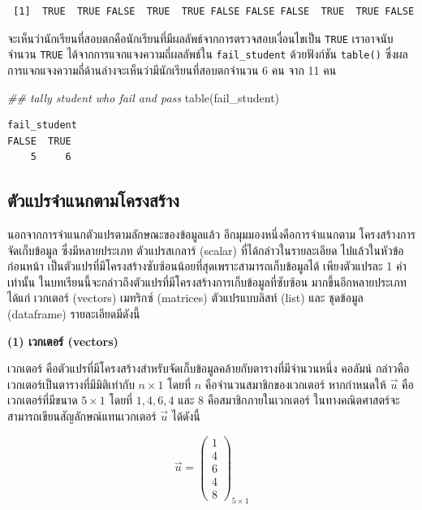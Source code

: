 \documentclass[
  a4paper,
]{book}
\newenvironment{Shaded}{\begin{snugshade}}{\end{snugshade}}
\newcommand{\DocumentationTok}[1]{\textcolor[rgb]{0.37,0.37,0.37}{\textit{#1}}}
\newcommand{\FunctionTok}[1]{\textcolor[rgb]{0.28,0.35,0.67}{#1}}
\newcommand{\NormalTok}[1]{\textcolor[rgb]{0.00,0.23,0.31}{#1}}
\begin{document}
\begin{verbatim}
 [1]  TRUE  TRUE FALSE  TRUE  TRUE FALSE FALSE FALSE  TRUE  TRUE FALSE
\end{verbatim}

จะเห็นว่านักเรียนที่สอบตกคือนักเรียนที่มีผลลัพธ์จากการตรวจสอบเงื่อนไขเป็น \texttt{TRUE}
เราอาจนับจำนวน \texttt{TRUE} ได้จากการแจกแจงความถี่ผลลัพธ์ใน
\texttt{fail\_student} ด้วยฟังก์ชัน \texttt{table()}
ซึ่งผลการแจกแจงความถี่ด้านล่างจะเห็นว่ามีนักเรียนที่สอบตกจำนวน 6 คน จาก 11 คน

\begin{Shaded}
\begin{Highlighting}[]
\DocumentationTok{\#\# tally student who fail and pass}
\FunctionTok{table}\NormalTok{(fail\_student)}
\end{Highlighting}
\end{Shaded}

\begin{verbatim}
fail_student
FALSE  TRUE 
    5     6 
\end{verbatim}

\subsection{ตัวแปรจำแนกตามโครงสร้าง}\label{uxe15uxe27uxe41uxe1buxe23uxe08uxe33uxe41uxe19uxe01uxe15uxe32uxe21uxe42uxe04uxe23uxe07uxe2auxe23uxe32uxe07}

นอกจากการจำแนกตัวแปรตามลักษณะของข้อมูลแล้ว อีกมุมมองหนึ่งคือการจำแนกตาม
โครงสร้างการจัดเก็บข้อมูล ซึ่งมีหลายประเภท ตัวแปรสเกลาร์ (scalar)
ที่ได้กล่าวในรายละเอียด ไปแล้วในหัวข้อก่อนหน้า
เป็นตัวแปรที่มีโครงสร้างซับซ้อนน้อยที่สุดเพราะสามารถเก็บข้อมูลได้ เพียงตัวแปรละ 1 ค่าเท่านั้น
ในบทเรียนนี้จะกล่าวถึงตัวแปรที่มีโครงสร้างการเก็บข้อมูลที่ซับซ้อน มากขึ้นอีกหลายประเภท ได้แก่
เวกเตอร์ (vectors) เมทริกซ์ (matrices) ตัวแปรแบบลิสท์ (list) และ ชุดข้อมูล
(dataframe) รายละเอียดมีดังนี้

\textbf{(1) เวกเตอร์ (vectors)}

เวกเตอร์ คือตัวแปรที่มีโครงสร้างสำหรับจัดเก็บข้อมูลคล้ายกับตารางที่มีจำนวนหนึ่ง คอลัมน์
กล่าวคือ เวกเตอร์เป็นตารางที่มีมิติเท่ากับ \(n \times 1\) โดยที่ \(n\)
คือจำนวนสมาชิกของเวกเตอร์ หากกำหนดให้ \(\vec{u}\) คือเวกเตอร์ที่มีขนาด
\(5 \times 1\) โดยที่ \(1, 4, 6, 4\) และ \(8\) คือสมาชิกภายในเวกเตอร์
ในทางคณิตศาสตร์จะสามารถเขียนสัญลักษณ์แทนเวกเตอร์ \(\vec{u}\) ได้ดังนี้

\[
\vec{u} = \begin{pmatrix}
  1 \\
  4 \\
  6 \\
  4 \\
  8
\end{pmatrix}_{5 \times 1}
\]
\end{document}
